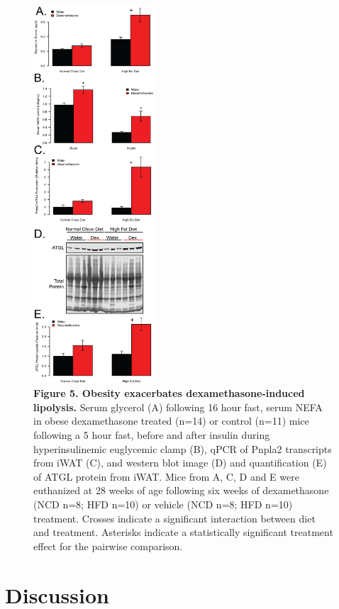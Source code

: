 \documentclass[11pt]{article} %
\begin{document}
\begin{figure}
  \begin{center}
    \includegraphics[width=0.4\textwidth]{Figures_Figure_5.png}
  \end{center}
  \caption{\textbf{Figure 5. Obesity exacerbates dexamethasone-induced lipolysis.} Serum glycerol (A) following 16 hour fast, serum NEFA in obese dexamethasone treated (n=14) or control (n=11) mice following a 5 hour fast, before and after insulin during hyperinsulinemic euglycemic clamp (B), qPCR of Pnpla2 transcripts from iWAT (C), and western blot image (D) and quantification (E) of ATGL protein from iWAT. Mice from A, C, D and E were euthanized at 28 weeks of age following six weeks of dexamethasone (NCD n=8; HFD n=10) or vehicle (NCD n=8; HFD n=10) treatment. Crosses indicate a significant interaction between diet and treatment. Asterisks indicate a statistically significant treatment effect for the pairwise comparison.}
 \label{fig:4}
\end{figure}

\section*{Discussion}
\end{document}
